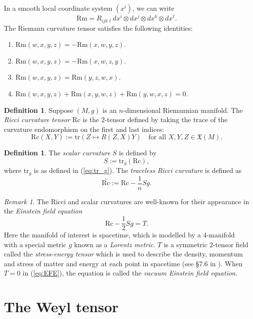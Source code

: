 \documentclass{amsart}
\numberwithin{equation}{section}
\def\frak#1{\mathfrak{#1}}
\newcommand{\tr}{\mathrm{tr}}
\newcommand{\Rc}{\mathrm{Rc}}
\newcommand{\Rm}{\mathrm{Rm}}
\newcommand{\tRc}{\overset{\circ}{\Rc}}
\theoremstyle{plain}
\theoremstyle{definition}
\newtheorem{defn}[thm]{Definition}
\theoremstyle{remark}
\newtheorem*{rmk}{Remark}
\begin{document}
In a smooth local coordinate system $(x^i)$, we can write
\[\Rm = R_{ijk\ell} dx^i \otimes dx^j \otimes dx^k \otimes dx^\ell.\]
The Riemann curvature tensor satisfies the following identities:
\begin{enumerate}
        \item $\Rm(w,x,y,z) = -\Rm(x, w, y, z)$.
        \item $\Rm(w,x,y,z) = -\Rm(x, w, z, y)$.
        \item $\Rm(w,x,y,z) = \Rm(y,z,w,x)$.
        \item $\Rm(w,x,y,z) + \Rm(x,y,w,z) + \Rm(y,w,x,z) = 0$.
\end{enumerate}
\begin{defn}
    Suppose $(M, g)$ is an $n$-dimensional Riemannian manifold. The \emph{Ricci curvature tensor} $\Rc$ is the $2$-tensor defined by taking the trace of the curvature endomorphism on the first and last indices:
    \[\Rc(X,Y) := \tr\left(Z \mapsto R(Z,X)Y\right) \quad \text{for all } X,Y,Z \in \frak{X}(M).\]
\end{defn}

\begin{defn}
    The \emph{scalar curvature} $S$ is defined by 
    \[S := \tr_g(\Rc),\]
    where $\tr_g$ is as defined in (\ref{eq:tr_g}). The \emph{traceless Ricci curvature} is defined as
    \begin{equation}\label{eq:tracelessricci}
    \tRc := \Rc - \frac{1}{n}S g.
    \end{equation}
\end{defn}

\begin{rmk}
The Ricci and scalar curvatures are well-known for their appearance in the \emph{Einstein field equation}
\begin{equation}\label{eq:EFE}
    \Rc - \frac{1}{2}Sg = T.
\end{equation}
Here the manifold of interest is spacetime, which is modelled by a $4$-manifold with a special metric $g$ known as a \emph{Lorentz metric}. $T$ is a symmetric $2$-tensor field called the \emph{stress-energy tensor} which is used to describe the density, momentum and stress of matter and energy at each point in spacetime (see \S7.6 in \cite{LeeRiemannian}). When $T = 0$ in (\ref{eq:EFE}), the equation is called the \emph{vacuum Einstein field equation}.
\end{rmk}

\section{The Weyl tensor}
\end{document}
